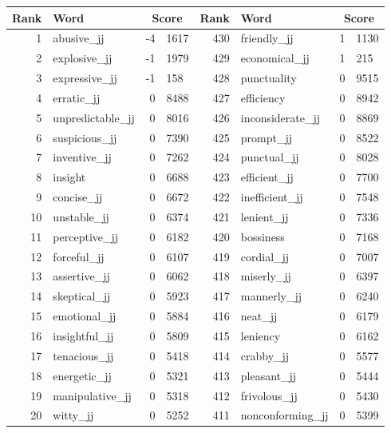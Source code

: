 \begin{table}[tbp]
    \begin{tabular}{| rlr@{.}l | rlr@{.}l |}
    \hline
    \textbf{Rank} & \textbf{Word} & \multicolumn{2}{c|}{\textbf{Score}} & \textbf{Rank} & \textbf{Word} & \multicolumn{2}{c|}{\textbf{Score}} \\
    \hline
    1 & abusive\_jj & -4 & 1617    &    430 & friendly\_jj & 1 & 1130 \\
    2 & explosive\_jj & -1 & 1979    &    429 & economical\_jj & 1 & 215 \\
    3 & expressive\_jj & -1 & 158    &    428 & punctuality & 0 & 9515 \\
    4 & erratic\_jj & 0 & 8488    &    427 & efficiency & 0 & 8942 \\
    5 & unpredictable\_jj & 0 & 8016    &    426 & inconsiderate\_jj & 0 & 8869 \\
    6 & suspicious\_jj & 0 & 7390    &    425 & prompt\_jj & 0 & 8522 \\
    7 & inventive\_jj & 0 & 7262    &    424 & punctual\_jj & 0 & 8028 \\
    8 & insight & 0 & 6688    &    423 & efficient\_jj & 0 & 7700 \\
    9 & concise\_jj & 0 & 6672    &    422 & inefficient\_jj & 0 & 7548 \\
    10 & unstable\_jj & 0 & 6374    &    421 & lenient\_jj & 0 & 7336 \\
    11 & perceptive\_jj & 0 & 6182    &    420 & bossiness & 0 & 7168 \\
    12 & forceful\_jj & 0 & 6107    &    419 & cordial\_jj & 0 & 7007 \\
    13 & assertive\_jj & 0 & 6062    &    418 & miserly\_jj & 0 & 6397 \\
    14 & skeptical\_jj & 0 & 5923    &    417 & mannerly\_jj & 0 & 6240 \\
    15 & emotional\_jj & 0 & 5884    &    416 & neat\_jj & 0 & 6179 \\
    16 & insightful\_jj & 0 & 5809    &    415 & leniency & 0 & 6162 \\
    17 & tenacious\_jj & 0 & 5418    &    414 & crabby\_jj & 0 & 5577 \\
    18 & energetic\_jj & 0 & 5321    &    413 & pleasant\_jj & 0 & 5444 \\
    19 & manipulative\_jj & 0 & 5318    &    412 & frivolous\_jj & 0 & 5430 \\
    20 & witty\_jj & 0 & 5252    &    411 & nonconforming\_jj & 0 & 5399 \\

\end{tabular}
\end{table}
